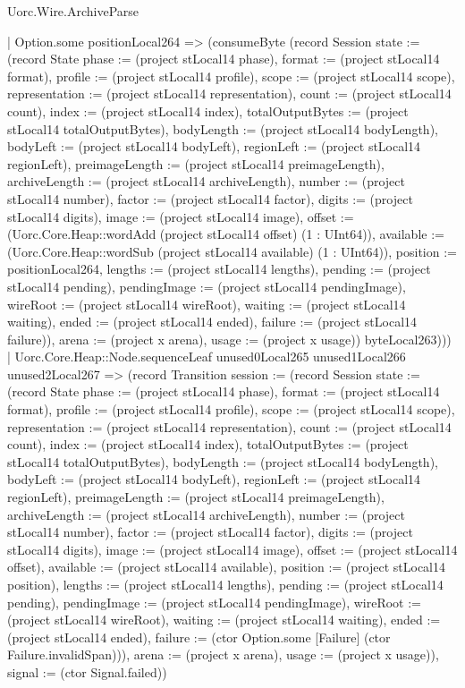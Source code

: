 \begin{lexlean}{Uorc.Wire.ArchiveParse}
\begin{semanticmodule}
{                | Option.some positionLocal264 => (consumeByte (record Session {state := (record State {phase := (project stLocal14 phase), format := (project stLocal14 format), profile := (project stLocal14 profile), scope := (project stLocal14 scope), representation := (project stLocal14 representation), count := (project stLocal14 count), index := (project stLocal14 index), totalOutputBytes := (project stLocal14 totalOutputBytes), bodyLength := (project stLocal14 bodyLength), bodyLeft := (project stLocal14 bodyLeft), regionLeft := (project stLocal14 regionLeft), preimageLength := (project stLocal14 preimageLength), archiveLength := (project stLocal14 archiveLength), number := (project stLocal14 number), factor := (project stLocal14 factor), digits := (project stLocal14 digits), image := (project stLocal14 image), offset := (Uorc.Core.Heap::wordAdd (project stLocal14 offset) (1 : UInt64)), available := (Uorc.Core.Heap::wordSub (project stLocal14 available) (1 : UInt64)), position := positionLocal264, lengths := (project stLocal14 lengths), pending := (project stLocal14 pending), pendingImage := (project stLocal14 pendingImage), wireRoot := (project stLocal14 wireRoot), waiting := (project stLocal14 waiting), ended := (project stLocal14 ended), failure := (project stLocal14 failure)}), arena := (project x arena), usage := (project x usage)}) byteLocal263)))
            | Uorc.Core.Heap::Node.sequenceLeaf unused0Local265 unused1Local266 unused2Local267 => (record Transition {session := (record Session {state := (record State {phase := (project stLocal14 phase), format := (project stLocal14 format), profile := (project stLocal14 profile), scope := (project stLocal14 scope), representation := (project stLocal14 representation), count := (project stLocal14 count), index := (project stLocal14 index), totalOutputBytes := (project stLocal14 totalOutputBytes), bodyLength := (project stLocal14 bodyLength), bodyLeft := (project stLocal14 bodyLeft), regionLeft := (project stLocal14 regionLeft), preimageLength := (project stLocal14 preimageLength), archiveLength := (project stLocal14 archiveLength), number := (project stLocal14 number), factor := (project stLocal14 factor), digits := (project stLocal14 digits), image := (project stLocal14 image), offset := (project stLocal14 offset), available := (project stLocal14 available), position := (project stLocal14 position), lengths := (project stLocal14 lengths), pending := (project stLocal14 pending), pendingImage := (project stLocal14 pendingImage), wireRoot := (project stLocal14 wireRoot), waiting := (project stLocal14 waiting), ended := (project stLocal14 ended), failure := (ctor Option.some [Failure] (ctor Failure.invalidSpan))}), arena := (project x arena), usage := (project x usage)}), signal := (ctor Signal.failed)})
}
\end{semanticmodule}
\end{lexlean}
